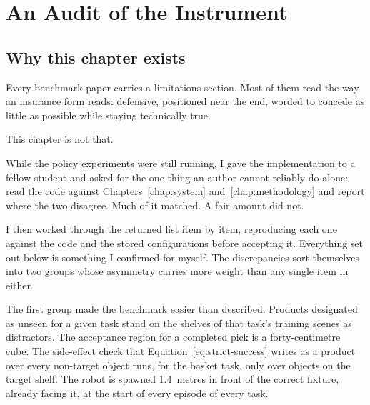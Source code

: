 %

\chapter{An Audit of the Instrument}
\label{chap:audit}
\begingroup
\justifying
\setlength{\parindent}{2em}
\setlength{\parskip}{0.55\baselineskip}

\section{Why this chapter exists}

Every benchmark paper carries a limitations section. Most of them read the way an insurance form reads: defensive, positioned near the end, worded to concede as little as possible while staying technically true.

This chapter is not that.

While the policy experiments were still running, I gave the implementation to a fellow student and asked for the one thing an author cannot reliably do alone: read the code against Chapters~\ref{chap:system} and~\ref{chap:methodology} and report where the two disagree. Much of it matched. A fair amount did not.

I then worked through the returned list item by item, reproducing each one against the code and the stored configurations before accepting it. Everything set out below is something I confirmed for myself. The discrepancies sort themselves into two groups whose asymmetry carries more weight than any single item in either.

The first group made the benchmark easier than described. Products designated as unseen for a given task stand on the shelves of that task's training scenes as distractors. The acceptance region for a completed pick is a forty-centimetre cube. The side-effect check that Equation~\ref{eq:strict-success} writes as a product over every non-target object runs, for the basket task, only over objects on the target shelf. The robot is spawned 1.4~metres in front of the correct fixture, already facing it, at the start of every episode of every task.

